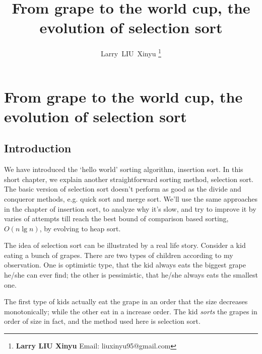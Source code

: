 \documentclass{article}
\begin{document}


\title{From grape to the world cup, the evolution of selection sort}

\author{Larry~LIU~Xinyu
\thanks{{\bfseries Larry LIU Xinyu } \newline
  Email: liuxinyu95@gmail.com \newline}
  }

\maketitle
\fi


\ifx\wholebook\relax
\chapter{From grape to the world cup, the evolution of selection sort}
\fi

\section{Introduction}
\label{introduction} 
We have introduced the `hello world' sorting algorithm, insertion
sort. In this short chapter, we explain another straightforward
sorting method, selection sort. The basic version of
selection sort doesn't perform as good as the divide and conqueror
methods, e.g. quick sort and merge sort. We'll use
the same approaches in the chapter of insertion sort, to
analyze why it's slow, and try to improve it by varies of
attempts till reach the best bound of comparison
based sorting, $O(n \lg n)$, by evolving to heap sort.

The idea of selection sort can be illustrated by a real life
story. Consider a kid eating a bunch of grapes. There are two
types of children according to my observation. One is optimistic
type, that the kid always eats the biggest grape he/she can ever
find; the other is pessimistic, that he/she always eats the
smallest one.

The first type of kids actually eat the grape in an order that
the size decreases monotonically; while the other eat in a increase
order. The kid {\em sorts} the grapes in order of size in fact,
and the method used here is selection sort.
\end{document}
